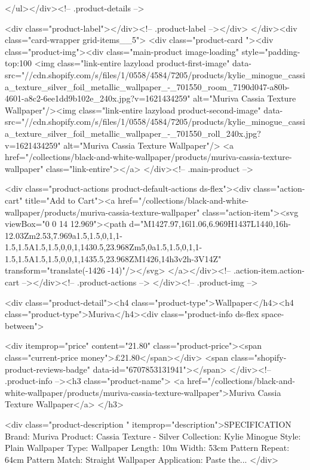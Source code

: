 {{{{{{{      </ul></div><!-- .product-details -->

<div class="product-label"></div><!-- .product-label --></div>
          </div><div class="card-wrapper grid-items__5">
            <div class="product-card "><div class="product-img"><div class="main-product image-loading" style="padding-top:100%
      <img class="link-entire lazyload product-first-image" data-src="//cdn.shopify.com/s/files/1/0558/4584/7205/products/kylie_minogue_cassia_texture_silver_foil_metallic_wallpaper_-_701550_room_7190d047-a80b-4601-a8c2-6ee1dd9b102e_240x.jpg?v=1621434259" alt="Muriva Cassia Texture Wallpaper"/><img class="link-entire lazyload product-second-image" data-src="//cdn.shopify.com/s/files/1/0558/4584/7205/products/kylie_minogue_cassia_texture_silver_foil_metallic_wallpaper_-_701550_roll_240x.jpg?v=1621434259" alt="Muriva Cassia Texture Wallpaper"/>
      <a href="/collections/black-and-white-wallpaper/products/muriva-cassia-texture-wallpaper" class="link-entire"></a>
    </div><!-- .main-product -->
  
<div class="product-actions product-default-actions ds-flex"><div class="action-cart" title="Add to Cart"><a href="/collections/black-and-white-wallpaper/products/muriva-cassia-texture-wallpaper" class="action-item"><svg viewBox="0 0 14 12.969"><path d="M1427.97,16l1.06,6.969H1437L1440,16h-12.03Zm2.53,7.969a1.5,1.5,0,1,1-1.5,1.5A1.5,1.5,0,0,1,1430.5,23.968Zm5,0a1.5,1.5,0,1,1-1.5,1.5A1.5,1.5,0,0,1,1435.5,23.968ZM1426,14h3v2h-3V14Z" transform="translate(-1426 -14)"/></svg>
</a></div><!-- .action-item.action-cart --></div><!-- .product-actions -->
</div><!-- .product-img -->

<div class="product-detail"><h4 class="product-type">Wallpaper</h4><h4 class="product-type">Muriva</h4><div class="product-info ds-flex space-between">
    
<div itemprop="price" content="21.80" class="product-price"><span class="current-price money">£21.80</span></div>
    <span class="shopify-product-reviews-badge" data-id="6707853131941"></span>
  </div><!-- .product-info --><h3 class="product-name">
      <a href="/collections/black-and-white-wallpaper/products/muriva-cassia-texture-wallpaper">Muriva Cassia Texture Wallpaper</a>
    </h3>
    
<div class="product-description " itemprop="description">SPECIFICATION Brand: Muriva Product: Cassia Texture - Silver Collection: Kylie Minogue Style: Plain Wallpaper Type: Wallpaper Length: 10m Width: 53cm Pattern Repeat: 64cm Pattern Match: Straight Wallpaper Application: Paste the...
</div>



}}}}}}}
